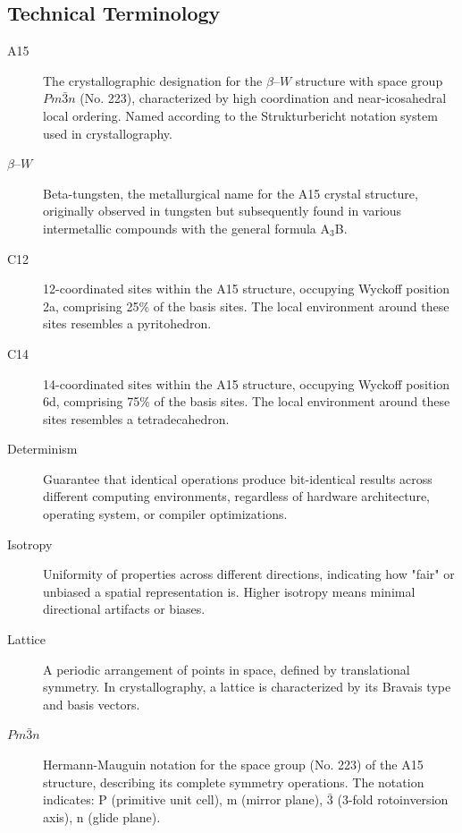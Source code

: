\documentclass[10pt]{article}
\def\betaW{$\beta$--$W$}
\begin{document}
\subsection{Technical Terminology}
\label{subsec-glossary-terms}

\begin{description}
    \item[A15] The crystallographic designation for the \betaW{} structure with space group $Pm\bar{3}n$ (No. 223), characterized by high coordination and near-icosahedral local ordering. Named according to the Strukturbericht notation system used in crystallography.

    \item[\betaW{}] Beta-tungsten, the metallurgical name for the A15 crystal structure, originally observed in tungsten but subsequently found in various intermetallic compounds with the general formula A$_3$B.

    \item[C12] 12-coordinated sites within the A15 structure, occupying Wyckoff position 2a, comprising 25\% of the basis sites. The local environment around these sites resembles a pyritohedron.

    \item[C14] 14-coordinated sites within the A15 structure, occupying Wyckoff position 6d, comprising 75\% of the basis sites. The local environment around these sites resembles a tetradecahedron.

    \item[Determinism] Guarantee that identical operations produce bit-identical results across different computing environments, regardless of hardware architecture, operating system, or compiler optimizations.

    \item[Isotropy] Uniformity of properties across different directions, indicating how "fair" or unbiased a spatial representation is. Higher isotropy means minimal directional artifacts or biases.

    \item[Lattice] A periodic arrangement of points in space, defined by translational symmetry. In crystallography, a lattice is characterized by its Bravais type and basis vectors.

    \item[$Pm\bar{3}n$] Hermann-Mauguin notation for the space group (No. 223) of the A15 structure, describing its complete symmetry operations. The notation indicates: P (primitive unit cell), m (mirror plane), $\bar{3}$ (3-fold rotoinversion axis), n (glide plane).


\end{description}
\end{document}
